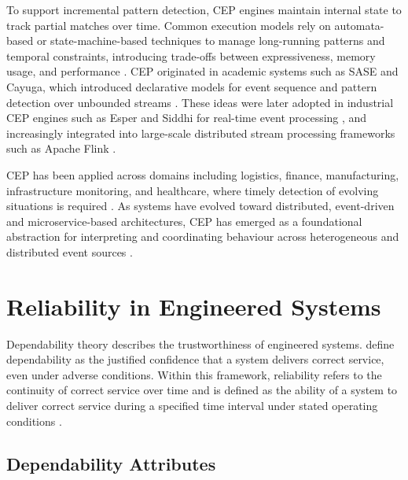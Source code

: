 To support incremental pattern detection, CEP engines maintain internal state to track partial matches over time. Common execution models rely on automata-based or state-machine-based techniques to manage long-running patterns and temporal constraints, introducing trade-offs between expressiveness, memory usage, and performance \cite{cugola2015complex}. CEP originated in academic systems such as SASE and Cayuga, which introduced declarative models for event sequence and pattern detection over unbounded streams \cite{wu2006high,brenna2007cayuga}. These ideas were later adopted in industrial CEP engines such as Esper and Siddhi for real-time event processing \cite{esper_reference,suhothayan2011siddhi}, and increasingly integrated into large-scale distributed stream processing frameworks such as Apache Flink \cite{carbone2015apache,dayarathna2018recent}.

CEP has been applied across domains including logistics, finance, manufacturing, infrastructure monitoring, and healthcare, where timely detection of evolving situations is required \cite{buchmann2009complex,manchana2021event}. As systems have evolved toward distributed, event-driven and microservice-based architectures, CEP has emerged as a foundational abstraction for interpreting and coordinating behaviour across heterogeneous and distributed event sources \cite{kommera2020power,dayarathna2018recent}.



\section{Reliability in Engineered Systems}
\label{sec:background-reliability}

Dependability theory describes the trustworthiness of engineered systems. 
\citet{avizienis2004basic} define dependability as the justified confidence that a system delivers correct service, even under adverse conditions. Within this framework, reliability refers to the continuity of correct service over time and is defined as the ability of a system to deliver correct service during a specified time interval under stated operating conditions \cite{avizienis2004basic}.

\subsection{Dependability Attributes}

